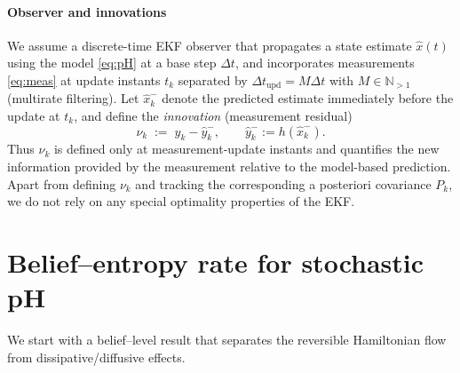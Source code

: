 \documentclass[final,5p,times,twocolumn]{elsarticle}
\begin{document}
	\paragraph*{Observer and innovations}
	We assume a discrete-time EKF observer that propagates a state estimate $\hat x(t)$ using the model \eqref{eq:pH} at a base step $\Delta t$, and incorporates measurements \eqref{eq:meas} at update instants $t_k$ separated by $\Delta t_{\mathrm{upd}}=M\Delta t$ with $M\in\mathbb{N}_{>1}$ (multirate filtering). Let $\hat x_k^-$ denote the predicted estimate immediately before the update at $t_k$, and define the \emph{innovation} (measurement residual)
	\begin{equation}
		\nu_k \;:=\; y_k - \hat y_k^-, \qquad \hat y_k^- := h(\hat x_k^-).
	\end{equation}
	Thus $\nu_k$ is defined only at measurement-update instants and quantifies the new information provided by the measurement relative to the model-based prediction. Apart from defining $\nu_k$ and tracking the corresponding a posteriori covariance $P_k$, we do not rely on any special optimality properties of the EKF.
	
	\section{Belief--entropy rate for stochastic pH}\label{sec:entropy}
	We start with a belief--level result that separates the reversible Hamiltonian flow from dissipative/diffusive effects.
	
\end{document}
